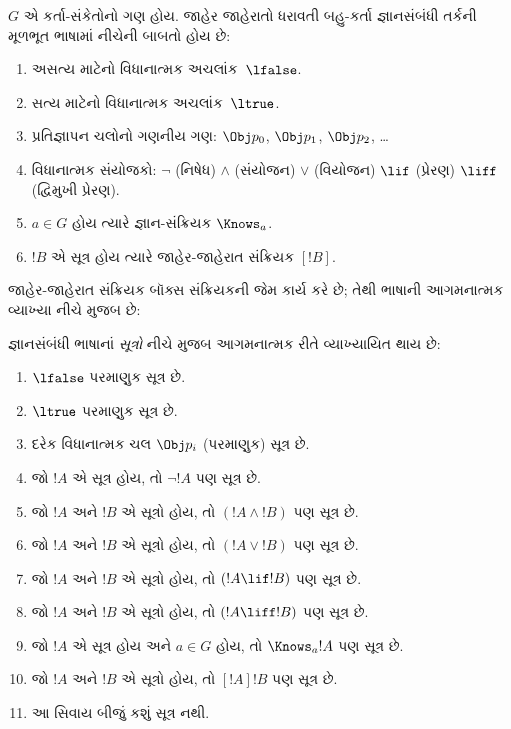 \begin{defn}
$G$ એ કર્તા-સંકેતોનો ગણ હોય. જાહેર જાહેરાતો ધરાવતી બહુ-કર્તા
જ્ઞાનસંબંધી તર્કની મૂળભૂત ભાષામાં નીચેની બાબતો હોય છે:
\begin{enumerate}
  \item અસત્ય માટેનો વિધાનાત્મક અચલાંક~$\lfalse$.
  \item સત્ય માટેનો વિધાનાત્મક અચલાંક~$\ltrue$.
  \item પ્રતિજ્ઞાપન ચલોનો ગણનીય ગણ: $\Obj
    p_0$, $\Obj p_1$, $\Obj p_2$, \dots
  \item વિધાનાત્મક સંયોજકો: \startycommalist
  \ycomma $\lnot$ (નિષેધ)%
  \ycomma $\land$ (સંયોજન)%
  \ycomma $\lor$ (વિયોજન)%
  \ycomma $\lif$ (પ્રેરણ)%
  \ycomma $\liff$ (દ્વિમુખી પ્રેરણ).
  \item $a \in G$ હોય ત્યારે જ્ઞાન-સંક્રિયક $\Knows_a$.
  \item $!B$ એ સૂત્ર હોય ત્યારે જાહેર-જાહેરાત
  સંક્રિયક $[!B]$.
\end{enumerate}
\end{defn}

જાહેર-જાહેરાત સંક્રિયક બૉક્સ સંક્રિયકની જેમ કાર્ય કરે છે;
તેથી ભાષાની આગમનાત્મક વ્યાખ્યા નીચે મુજબ છે:

\begin{defn}
  જ્ઞાનસંબંધી ભાષાનાં \emph{સૂત્રો} નીચે મુજબ આગમનાત્મક રીતે
  વ્યાખ્યાયિત થાય છે:
  \begin{enumerate}
  \item $\lfalse$ પરમાણુક સૂત્ર છે.

  \item $\ltrue$ પરમાણુક સૂત્ર છે.

  \item દરેક વિધાનાત્મક ચલ $\Obj p_i$ (પરમાણુક) સૂત્ર છે.

  \item જો $!A$ એ સૂત્ર હોય, તો $\lnot !A$ પણ
  સૂત્ર છે.

  \item જો $!A$ અને $!B$ એ સૂત્રો હોય, તો $(!A \land
  !B)$ પણ સૂત્ર છે.

  \item જો $!A$ અને $!B$ એ સૂત્રો હોય, તો $(!A \lor !B)$
  પણ સૂત્ર છે.

  \item જો $!A$ અને $!B$ એ સૂત્રો હોય, તો $(!A \lif !B)$
  પણ સૂત્ર છે.

  \item જો $!A$ અને $!B$ એ સૂત્રો હોય, તો $(!A \liff !B)$
  પણ સૂત્ર છે.

  \item જો $!A$ એ સૂત્ર હોય અને $a \in G$ હોય, તો $\Knows_a !A$
  પણ સૂત્ર છે.
  
  \item જો $!A$ અને $!B$ એ સૂત્રો હોય, તો $[!A] !B$ પણ
  સૂત્ર છે.

  \item આ સિવાય બીજું કશું સૂત્ર નથી.
\end{enumerate}
\end{defn}

